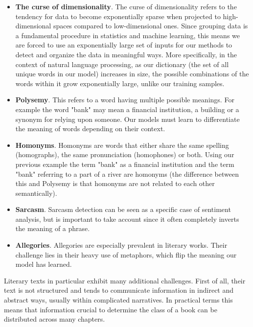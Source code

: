 \documentclass{article}
\begin{document}
	\begin{itemize}
		\item \textbf{The curse of dimensionality}. The curse of dimensionality refers to the tendency for data to become exponentially sparse when projected to high-dimensional spaces compared to low-dimensional ones. Since grouping data is a fundamental procedure in statistics and machine learning, this means we are forced to use an exponentially large set of inputs for our methods to detect and organize the data in meaningful ways. More specifically, in the context of natural language processing, as our dictionary (the set of all unique words in our model) increases in size, the possible combinations of the words within it grow exponentially large, unlike our training samples.
		
		\item \textbf{Polysemy}. This refers to a word having multiple possible meanings. For example the word "bank" may mean a financial institution, a building or a synonym for relying upon someone. Our models must learn to differentiate the meaning of words depending on their context.
		
		\item \textbf{Homonyms}. Homonyms are words that either share the same spelling (homographs), the same pronunciation (homophones) or both. Using our previous example the term "bank" as a financial institution and the term "bank" referring to a part of a river are homonyms (the difference between this and Polysemy is that homonyms are not related to each other semantically).
		
		\item \textbf{Sarcasm}. Sarcasm detection can be seen as a specific case of sentiment analysis, but is important to take account since it often completely inverts the meaning of a phrase. %
		
		\item \textbf{Allegories}. Allegories are especially prevalent in literary works. Their challenge lies in their heavy use of metaphors, which flip the meaning our model has learned.
	\end{itemize}
	
	
	Literary texts in particular exhibit many additional challenges. First of all, their text is not structured and tends to communicate information in indirect and abstract ways, usually within complicated narratives. In practical terms this means that information crucial to determine the class of a book can be distributed across many chapters\cite{worsham}. \par 
	
\end{document}
